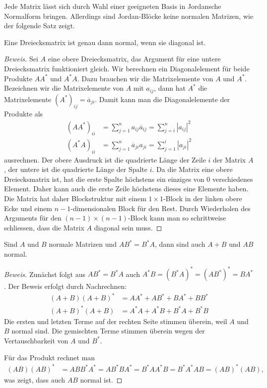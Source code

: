 Jede Matrix lässt sich durch Wahl einer geeigneten Basis in Jordansche 
Normalform bringen.
Allerdings sind Jordan-Blöcke keine normalen Matrizen, wie der folgende
Satz zeigt.

\begin{satz}
Eine Dreiecksmatrix ist genau dann normal, wenn sie diagonal ist.
\end{satz}

\begin{proof}[Beweis]
Sei $A$ eine obere Dreiecksmatrix, das Argument für eine untere Dreiecksmatrix
funktioniert gleich.
Wir berechnen ein Diagonalelement für beide Produkte $AA^*$ und $A^*A$.
Dazu brauchen wir die Matrixelemente von $A$ und $A^*$.
Bezeichnen wir die Matrixelemente von $A$ mit $a_{ij}$, dann hat $A^*$
die Matrixelemente $(A^*)_{ij}=\overline{a}_{ji}$.
Damit kann man die Diagonalelemente der Produkte als
\begin{align*}
(AA^*)_{ii}
&=
\sum_{j=1}^n a_{ij}\overline{a}_{ij}
=
\sum_{j=i}^n |a_{ij}|^2
\\
(A^*A)_{ii}
&=
\sum_{j=1}^n \overline{a}_{ji}a_{ji}
=
\sum_{j=1}^i |a_{ji}|^2
\end{align*}
ausrechnen.
Der obere Ausdruck ist die quadrierte Länge der Zeile $i$ der Matrix $A$,
der untere ist die quadrierte Länge der Spalte $i$.
Da die Matrix eine obere Dreiecksmatrix ist, hat die erste Spalte höchstens
ein einziges von $0$ verschiedenes Element.
Daher kann auch die erste Zeile höchstens dieses eine Elemente haben.
Die Matrix hat daher Blockstruktur mit einem $1\times 1$-Block in der
linken obere Ecke und einem  $n-1$-dimensionalen Block für den Rest.
Durch Wiederholen des Arguments für den $(n-1)\times (n-1)$-Block 
kann man so schrittweise schliessen, dass die Matrix $A$ diagonal sein muss.
\end{proof}


\begin{satz}
Sind $A$ und $B$ normale Matrizen und $AB^*=B^*A$, dann sind auch $A+B$
und $AB$ normal.
\end{satz}

\begin{proof}[Beweis]
Zunächst folgt aus $AB^*=B^*A$ auch
$A^*B = (B^*A)^* = (AB^*)^* = BA^*$.
Der Beweis erfolgt durch Nachrechnen:
\begin{align*}
(A+B)(A+B)^*
&=
AA^* + AB^* + BA^*+BB^*
\\
(A+B)^*(A+B)
&=
A^*A + A^*B + B^*A + B^*B
\end{align*}
Die ersten und letzten Terme auf der rechten Seite stimmen überein, weil
$A$ und $B$ normal sind.
Die gemischten Terme stimmen überein wegen der Vertauschbarkeit von
$A$ und $B^*$.

Für das Produkt rechnet man
\begin{align*}
(AB)(AB)^*
&= ABB^*A^* = AB^*BA^*
= B^*AA^*B
=
B^*A^*AB
=
(AB)^*(AB),
\end{align*}
was zeigt, dass auch $AB$ normal ist.
\end{proof}

